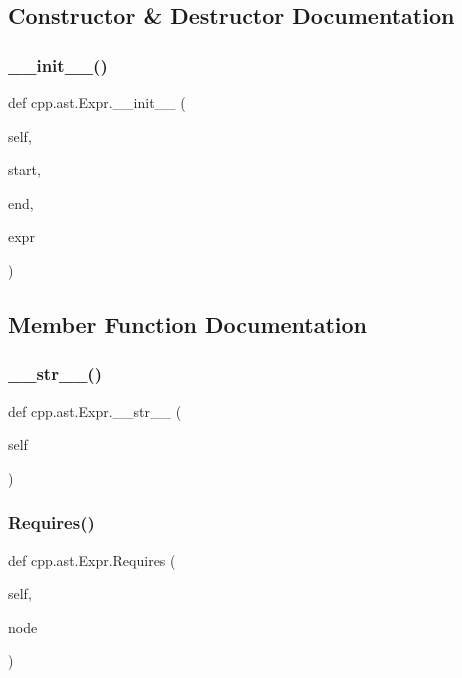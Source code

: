 \subsection{Constructor \& Destructor Documentation}
\mbox{\label{classcpp_1_1ast_1_1Expr_adc83f4b17d6e28a39781678692eb25aa}} 
\subsubsection{\texorpdfstring{\_\_init\_\_()}{\_\_init\_\_()}}
{\footnotesize\ttfamily def cpp.\+ast.\+Expr.\+\_\+\+\_\+init\+\_\+\+\_\+ (\begin{DoxyParamCaption}\item[{}]{self,  }\item[{}]{start,  }\item[{}]{end,  }\item[{}]{expr }\end{DoxyParamCaption})}



\subsection{Member Function Documentation}
\mbox{\label{classcpp_1_1ast_1_1Expr_a7ee1896fbfa7819adbd0b2f89d11ecec}} 
\subsubsection{\texorpdfstring{\_\_str\_\_()}{\_\_str\_\_()}}
{\footnotesize\ttfamily def cpp.\+ast.\+Expr.\+\_\+\+\_\+str\+\_\+\+\_\+ (\begin{DoxyParamCaption}\item[{}]{self }\end{DoxyParamCaption})}

\mbox{\label{classcpp_1_1ast_1_1Expr_a9c92416eb1285068f190dcda8fd33682}} 
\subsubsection{\texorpdfstring{Requires()}{Requires()}}
{\footnotesize\ttfamily def cpp.\+ast.\+Expr.\+Requires (\begin{DoxyParamCaption}\item[{}]{self,  }\item[{}]{node }\end{DoxyParamCaption})}

